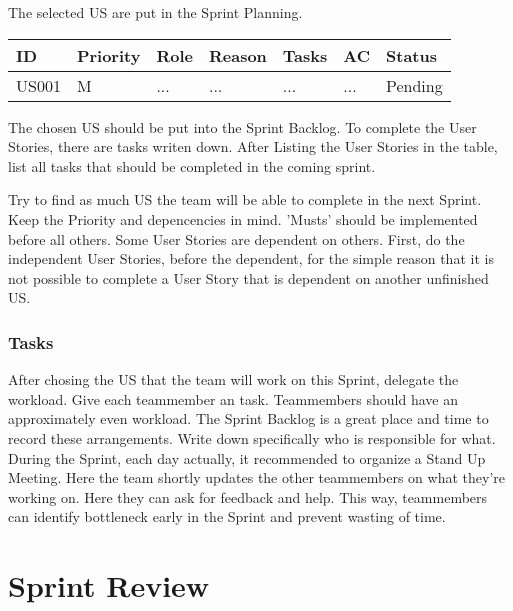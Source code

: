 \documentclass[10pt]{report}
\begin{document}
The selected US are put in the Sprint Planning. 

\medskip
\begin{tabularx}{0.8\textwidth} {
  | >{\raggedright\arraybackslash}X 
  | >{\centering\arraybackslash}X 
  | >{\raggedright\arraybackslash}X 
  | >{\raggedright\arraybackslash}X 
  | >{\raggedright\arraybackslash}X 
  | >{\raggedright\arraybackslash}X 
  | >{\raggedleft\arraybackslash}X | }
 \hline
 ID & Priority & Role & Reason & Tasks & AC & Status \\
 \hline
 US001 & M & ... & ...  & ... & ... & Pending \\
 \hline
\end{tabularx}
\medskip

\noindent The chosen US should be put into the Sprint Backlog. To complete the User Stories, there are tasks writen down. After Listing the User Stories in the table, list all tasks that should be completed in the coming sprint. 

Try to find as much US the team will be able to complete in the next Sprint. Keep the Priority and depencencies in mind. 'Musts' should be implemented before all others. Some User Stories are dependent on others. First, do the independent User Stories, before the dependent, for the simple reason that it is not possible to complete a User Story that is dependent on another unfinished US.

\subsubsection{Tasks}

After chosing the US that the team will work on this Sprint, delegate the workload. Give each teammember an task. Teammembers should have an approximately even workload. The Sprint Backlog is a great place and time to record these arrangements. Write down specifically who is responsible for what. During the Sprint, each day actually, it recommended to organize a Stand Up Meeting. Here the team shortly updates the other teammembers on what they're working on. Here they can ask for feedback and help. This way, teammembers can identify bottleneck early in the Sprint and prevent wasting of time.

\newpage

\section{Sprint Review}
\end{document}
